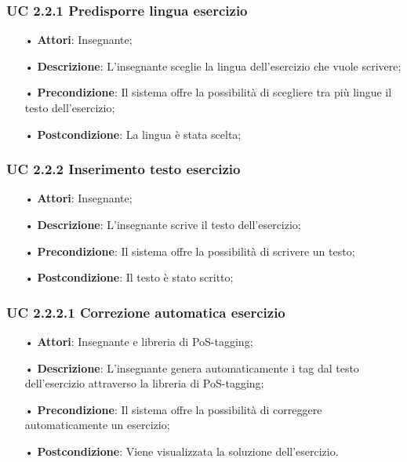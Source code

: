 \subsubsection{UC 2.2.1 Predisporre lingua esercizio}
\begin{itemize}
	\item[•] \textbf{Attori}: Insegnante;
	\item[•] \textbf{Descrizione}: L'insegnante sceglie la lingua dell’esercizio che vuole scrivere;
	\item[•] \textbf{Precondizione}: Il sistema offre la possibilità di scegliere tra più lingue il testo dell’esercizio;
	\item[•] \textbf{Postcondizione}: La lingua è stata scelta;
\end{itemize}
\subsubsection{UC 2.2.2 Inserimento testo esercizio}

\begin{itemize}
	\item[•] \textbf{Attori}: Insegnante;
	\item[•] \textbf{Descrizione}: L'insegnante scrive il testo dell’esercizio;
	\item[•] \textbf{Precondizione}: Il sistema offre la possibilità di scrivere un testo;
	\item[•] \textbf{Postcondizione}: Il testo è stato scritto;
\end{itemize}

\subsubsection{UC 2.2.2.1 Correzione automatica esercizio}
\begin{itemize}
	\item[•] \textbf{Attori}: Insegnante e libreria di {PoS-tagging};
	\item[•] \textbf{Descrizione}: L’insegnante genera automaticamente i tag dal testo dell’esercizio attraverso la libreria di PoS-tagging;
	\item[•] \textbf{Precondizione}: Il sistema offre la possibilità di correggere automaticamente un esercizio;
	\item[•] \textbf{Postcondizione}: Viene visualizzata la soluzione dell'esercizio.
\end{itemize}

